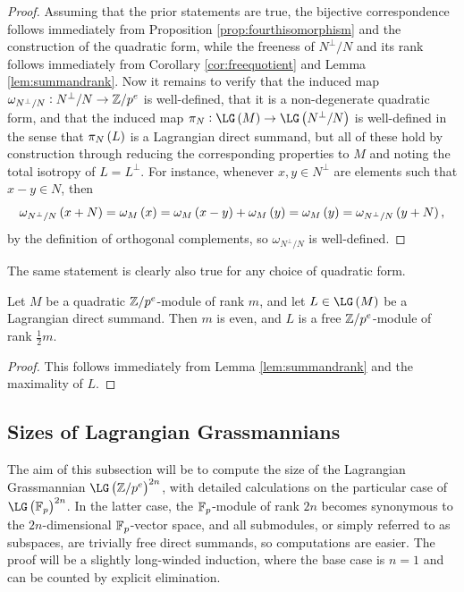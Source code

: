 \pagebreak

\begin{proof}
Assuming that the prior statements are true, the bijective correspondence follows immediately from Proposition \ref{prop:fourthisomorphism} and the construction of the quadratic form, while the freeness of $ N^\perp / N $ and its rank follows immediately from Corollary \ref{cor:freequotient} and Lemma \ref{lem:summandrank}. Now it remains to verify that the induced map $ \omega_{N^\perp / N} : N^\perp / N \to \mathbb{Z} / p^e $ is well-defined, that it is a non-degenerate quadratic form, and that the induced map $ \pi_N : \LG\br{M} \to \LG\br{N^\perp / N} $ is well-defined in the sense that $ \pi_N\br{L} $ is a Lagrangian direct summand, but all of these hold by construction through reducing the corresponding properties to $ M $ and noting the total isotropy of $ L = L^\perp $. For instance, whenever $ x, y \in N^\perp $ are elements such that $ x - y \in N $, then
$$ \omega_{N^\perp / N}\br{x + N} = \omega_M\br{x} = \omega_M\br{x - y} + \omega_M\br{y} = \omega_M\br{y} = \omega_{N^\perp / N}\br{y + N}, $$
by the definition of orthogonal complements, so $ \omega_{N^\perp / N} $ is well-defined.
\end{proof}

\begin{remark}
The same statement is clearly also true for any choice of quadratic form.
\end{remark}

\begin{corollary}
\label{cor:lagrangianrank}
Let $ M $ be a quadratic $ \mathbb{Z} / p^e $-module of rank $ m $, and let $ L \in \LG\br{M} $ be a Lagrangian direct summand. Then $ m $ is even, and $ L $ is a free $ \mathbb{Z} / p^e $-module of rank $ \tfrac{1}{2}m $.
\end{corollary}

\begin{proof}
This follows immediately from Lemma \ref{lem:summandrank} and the maximality of $ L $.
\end{proof}

\subsection{Sizes of Lagrangian Grassmannians}

The aim of this subsection will be to compute the size of the Lagrangian Grassmannian $ \LG\br{\ZZ / p^e}^{2n} $, with detailed calculations on the particular case of $ \LG\br{\FF_p}^{2n} $. In the latter case, the $ \mathbb{F}_p $-module of rank $ 2n $ becomes synonymous to the $ 2n $-dimensional $ \mathbb{F}_p $-vector space, and all submodules, or simply referred to as subspaces, are trivially free direct summands, so computations are easier. The proof will be a slightly long-winded induction, where the base case is $ n = 1 $ and can be counted by explicit elimination.

